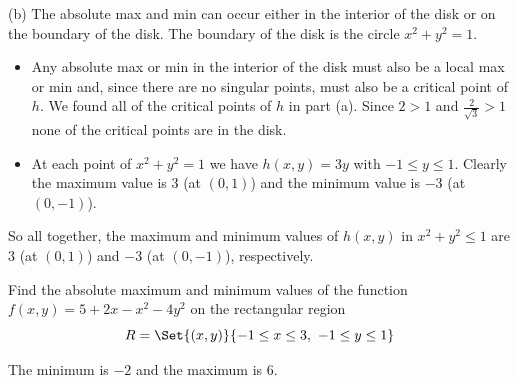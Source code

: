 \begin{solution}
(b) The absolute max and min can occur either in the interior
    of the disk or on the boundary of the disk. The boundary
    of the disk is the circle $x^2+y^2=1$.
\begin{itemize}
\item Any absolute max or min in the interior of the disk
      must also be a local max or min and, since there are no
      singular points, must also be a critical point of $h$.
      We found all of the critical points of $h$ in part (a).
      Since $2>1$ and $\frac{2}{\sqrt{3}}>1$ none of the critical
      points are in the disk.
\item At each point of $x^2+y^2=1$ we have 
           $h(x,y)=3y$ 
           with $-1\le y\le 1$. Clearly the maximum value is $3$
           (at $(0,1)$) and the minimum value is $-3$ (at $(0,-1)$). 
\end{itemize}
So all together, the maximum and minimum values of $h(x,y)$ in $x^2+y^2\le 1$
     are $3$ (at $(0,1)$) and  $-3$ (at $(0,-1)$), respectively.
\end{solution}

\begin{question}[M200 2012D] %
Find the absolute maximum and minimum
values of the function
$f(x, y) = 5 + 2x - x^2 - 4y^2$ on the rectangular region 
\begin{equation*}
R = \Set{(x, y)}{ -1 \le x \le 3,\  -1 \le y \le 1}
\end{equation*}
\end{question}

%

\begin{answer}
The minimum is $-2$ and the maximum is $6$.
\end{answer}

